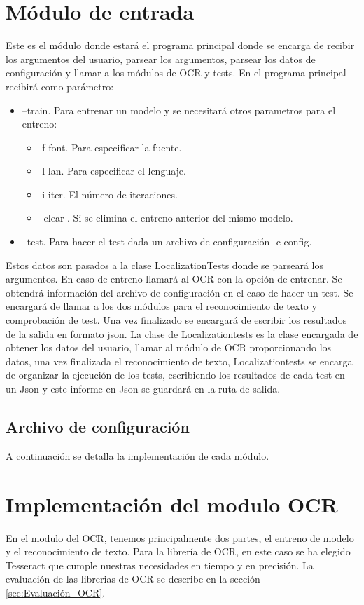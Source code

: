 \section{Módulo de entrada}
Este es el módulo donde estará el programa principal donde se encarga de recibir los argumentos del usuario, parsear los argumentos, parsear los datos de configuración y llamar a los módulos de OCR y tests.
En el programa principal recibirá como parámetro:
\begin{itemize}
	\item --train. Para entrenar un modelo y se necesitará otros parametros para el entreno:
	\begin{itemize}
		\item -f font. Para especificar la fuente.
		\item -l lan. Para especificar el lenguaje.
		\item -i iter. El número de iteraciones.
		\item --clear . Si se elimina el entreno anterior del mismo modelo.
	\end{itemize}
	\item --test. Para hacer el test dada un archivo de configuración -c config.
\end{itemize}
Estos datos son pasados a la clase LocalizationTests donde se parseará los argumentos. En caso de entreno llamará al OCR con la opción de entrenar. Se obtendrá información del archivo de configuración en el caso de hacer un test. Se encargará de llamar a los dos módulos para el reconocimiento de texto y comprobación de test. Una vez finalizado se encargará de escribir los resultados de la salida en formato json.
La clase de Localizationtests es la clase encargada de obtener los datos del usuario, llamar al módulo de OCR proporcionando los datos, una vez finalizada el reconocimiento de texto, Localizationtests se encarga de organizar la ejecución de los tests, escribiendo los resultados de cada test en un Json y este informe en Json se guardará en la ruta de salida.
\subsection{Archivo de configuración}


A continuación se detalla la implementación de cada módulo.
\section{Implementación del modulo OCR}
\label{sec:Implementación del OCR}
En el modulo del OCR, tenemos principalmente dos partes, el entreno de modelo y el reconocimiento de texto. Para la librería de OCR, en este caso se ha elegido Tesseract que cumple nuestras necesidades en tiempo y en precisión. La evaluación de las librerias de OCR se describe en la sección \ref{sec:Evaluación_OCR}.
